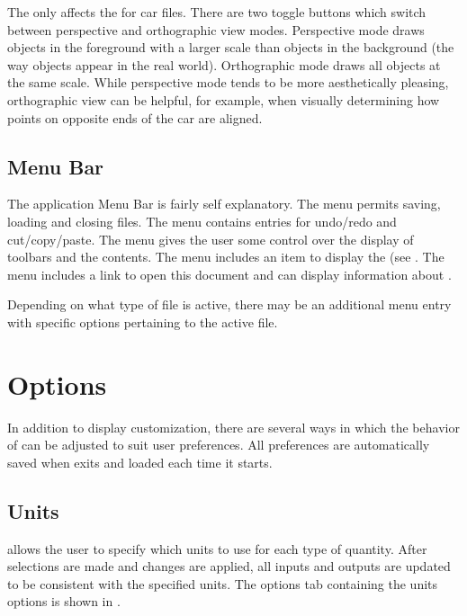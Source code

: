 The  only affects the  for car files.  There are two toggle buttons which switch between perspective and orthographic view modes.  Perspective mode draws objects in the foreground with a larger scale than objects in the background (the way objects appear in the real world).  Orthographic mode draws all objects at the same scale.  While perspective mode tends to be more aesthetically pleasing, orthographic view can be helpful, for example, when visually determining how points on opposite ends of the car are aligned.

\subsection{Menu Bar} \label{ssec:menuBar}

The application Menu Bar is fairly self explanatory.  The  menu permits saving, loading and closing files.  The  menu contains entries for undo/redo and cut/copy/paste.  The  menu gives the user some control over the display of toolbars and the  contents.  The  menu includes an item to display the  (see .  The  menu includes a link to open this document and can display information about \vvase{}.

Depending on what type of file is active, there may be an additional menu entry with specific options pertaining to the active file.

\section{Options} \label{sec:options}

In addition to display customization, there are several ways in which the behavior of \vvase{} can be adjusted to suit user preferences.  All preferences are automatically saved when \vvase{} exits and loaded each time it starts.

\subsection{Units} \label{ssec:optionsUnits}

\vvase{} allows the user to specify which units to use for each type of quantity.  After selections are made and changes are applied, all inputs and outputs are updated to be consistent with the specified units.  The options tab containing the units options is shown in .

